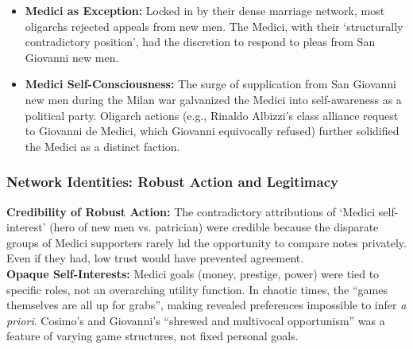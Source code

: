 \documentclass{article}
\begin{document}
\begin{itemize}
\begin{itemize}
            \item \textbf{Medici as Exception:} Locked in by their dense
            marriage network, most oligarchs rejected appeals from new men.
            The Medici, with their `structurally contradictory position',
            had the discretion to respond to pleas from San Giovanni new men.
            \item \textbf{Medici Self-Consciousness:} The surge of
            supplication from San Giovanni new men during the Milan war
            galvanized the Medici into self-awareness as a political party.
            Oligarch actions (e.g., Rinaldo Albizzi's class alliance request
            to Giovanni de Medici, which Giovanni equivocally refused)
            further solidified the Medici as a distinct faction.
        \end{itemize}
    \end{itemize}

    \subsubsection{Network Identities: Robust Action and Legitimacy}

    \noindent \textbf{Credibility of Robust Action:} The contradictory
attributions of `Medici self-interest' (hero of new men vs. patrician) were
credible because the disparate groups of Medici supporters rarely hd the
opportunity to compare notes privately. Even if they had, low trust would
have prevented agreement.\\

    \noindent \textbf{Opaque Self-Interests:} Medici goals (money, prestige,
power) were tied to specific roles, not an overarching utility function. In
chaotic times, the ``games themselves are all up for grabs'', making
revealed preferences impossible to infer \textit{a priori}. Cosimo's and
Giovanni's ``shrewed and multivocal opportunism'' was a feature of varying
game structures, not fixed personal goals.\\
\end{document}
